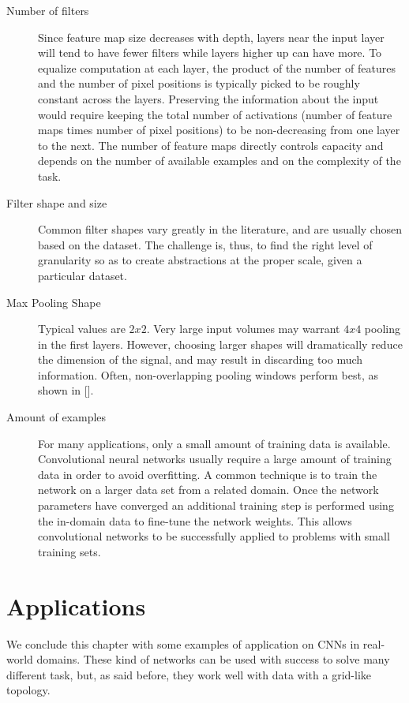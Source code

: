 \begin{description}
	
	\item[Number of filters] Since feature map size decreases with depth, layers near the input layer will tend to have fewer filters while layers higher up can have more. To equalize computation at each layer, the product of the number of features and the number of pixel positions is typically picked to be roughly constant across the layers. Preserving the information about the input would require keeping the total number of activations (number of feature maps times number of pixel positions) to be non-decreasing from one layer to the next.
	The number of feature maps directly controls capacity and depends on the number of available examples and on the complexity of the task.
	
	\item[Filter shape and size] Common filter shapes vary greatly in the literature, and are usually chosen based on the dataset. The challenge is, thus, to find the right level of granularity so as to create abstractions at the proper scale, given a particular dataset.
	
	\item[Max Pooling Shape] Typical values are $2x2$. Very large input volumes may warrant $4x4$ pooling in the first layers. However, choosing larger shapes will dramatically reduce the dimension of the signal, and may result in discarding too much information. Often, non-overlapping pooling windows perform best, as shown in [\cite{Scherer:2010}].
	
	\item[Amount of examples] For many applications, only a small amount of training data is available. Convolutional neural networks usually require a large amount of training data in order to avoid overfitting. A common technique is to train the network on a larger data set from a related domain. Once the network parameters have converged an additional training step is performed using the in-domain data to fine-tune the network weights. This allows convolutional networks to be successfully applied to problems with small training sets.
	
\end{description}

\section{Applications}

We conclude this chapter with some examples of application on \acp{CNN} in real-world domains. These kind of networks can be used with success to solve many different task, but, as said before, they work well with data with a grid-like topology.

